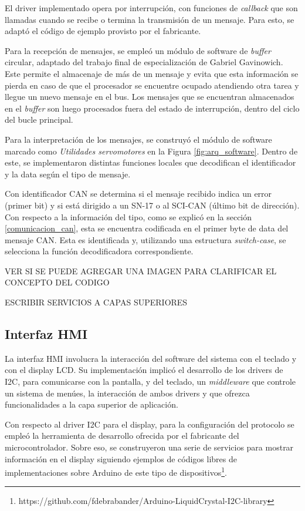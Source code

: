 El driver implementado opera por interrupción, con funciones de \textit{callback} que son llamadas cuando se recibe o termina la transmisión de un mensaje. Para esto, se adaptó el código de ejemplo provisto por el fabricante.

Para la recepción de mensajes, se empleó un módulo de software de \textit{buffer} circular, adaptado del trabajo final de especialización de Gabriel Gavinowich\citep{tpf_gabriel}. Este permite el almacenaje de más de un mensaje y evita que esta información se pierda en caso de que el procesador se encuentre ocupado atendiendo otra tarea y llegue un nuevo mensaje en el bus. Los mensajes que se encuentran almacenados en el \textit{buffer} son luego procesados fuera del estado de interrupción, dentro del ciclo del bucle principal.

Para la interpretación de los mensajes, se construyó el módulo de software marcado como \textit{Utilidades servomotores} en la Figura \ref{fig:arq_software}. Dentro de este, se implementaron distintas funciones locales que decodifican el identificador y la data según el tipo de mensaje. 

Con identificador CAN se determina si el mensaje recibido indica un error (primer bit) y si está dirigido a un SN-17 o al SCI-CAN (último bit de dirección). Con respecto a la información del tipo, como se explicó en la sección \ref{comunicacion_can}, esta se encuentra codificada en el primer byte de data del mensaje CAN. Esta es identificada y, utilizando una estructura \textit{switch-case}, se selecciona la función decodificadora correspondiente.

VER SI SE PUEDE AGREGAR UNA IMAGEN PARA CLARIFICAR EL CONCEPTO DEL CODIGO

ESCRIBIR SERVICIOS A CAPAS SUPERIORES 

\subsection{Interfaz HMI}

La interfaz HMI involucra la interacción del software del sistema con el teclado y con el display LCD. Su implementación implicó el desarrollo de los drivers de I2C, para comunicarse con la pantalla, y del teclado, un \textit{middleware} que controle un sistema de menúes, la interacción de ambos drivers y que ofrezca funcionalidades a la capa superior de aplicación.

Con respecto al driver I2C para el display, para la configuración del protocolo se empleó la herramienta de desarrollo ofrecida por el fabricante del microcontrolador. Sobre eso, se construyeron una serie de servicios para mostrar información en el display siguiendo ejemplos de códigos libres de implementaciones sobre Arduino\citep{web_arduino} de este tipo de dispositivos\footnote{https://github.com/fdebrabander/Arduino-LiquidCrystal-I2C-library}.


